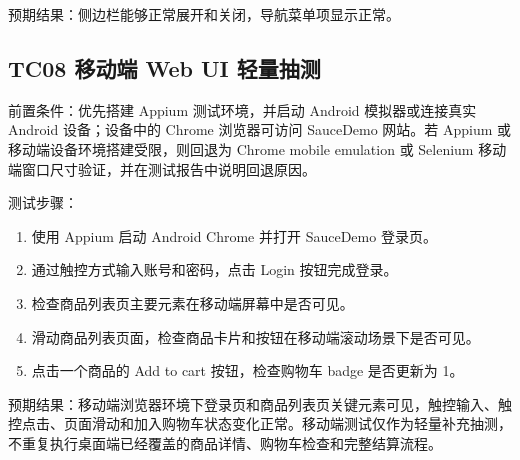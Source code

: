 \documentclass[UTF8,a4paper,12pt]{ctexart}
\begin{document}
预期结果：侧边栏能够正常展开和关闭，导航菜单项显示正常。

\subsection{TC08 移动端 Web UI 轻量抽测}

前置条件：优先搭建 Appium 测试环境，并启动 Android 模拟器或连接真实 Android 设备；设备中的 Chrome 浏览器可访问 SauceDemo 网站。若 Appium 或移动端设备环境搭建受限，则回退为 Chrome mobile emulation 或 Selenium 移动端窗口尺寸验证，并在测试报告中说明回退原因。

测试步骤：

\begin{enumerate}
  \item 使用 Appium 启动 Android Chrome 并打开 SauceDemo 登录页。
  \item 通过触控方式输入账号和密码，点击 Login 按钮完成登录。
  \item 检查商品列表页主要元素在移动端屏幕中是否可见。
  \item 滑动商品列表页面，检查商品卡片和按钮在移动端滚动场景下是否可见。
  \item 点击一个商品的 Add to cart 按钮，检查购物车 badge 是否更新为 1。
\end{enumerate}

预期结果：移动端浏览器环境下登录页和商品列表页关键元素可见，触控输入、触控点击、页面滑动和加入购物车状态变化正常。移动端测试仅作为轻量补充抽测，不重复执行桌面端已经覆盖的商品详情、购物车检查和完整结算流程。
\end{document}
